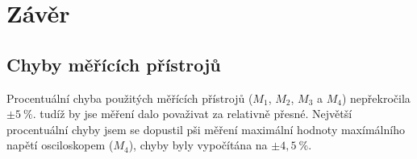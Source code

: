 \section*{Závěr}
  
  
  \subsection*{Chyby měřících přístrojů}
    \indent\indent
    Procentuální chyba použitých měřících přístrojů ($M_1$, $M_2$, $M_3$ a $M_4$) nepřekročila $\pm5~\%$. tudíž by jse měření dalo považivat za relativně přesné. Největší procentuální chyby jsem se dopustil pši měření maximální hodnoty maxímálního napětí osciloskopem ($M_4$), chyby byly vypočítána na $\pm4,5~\%$.
  
